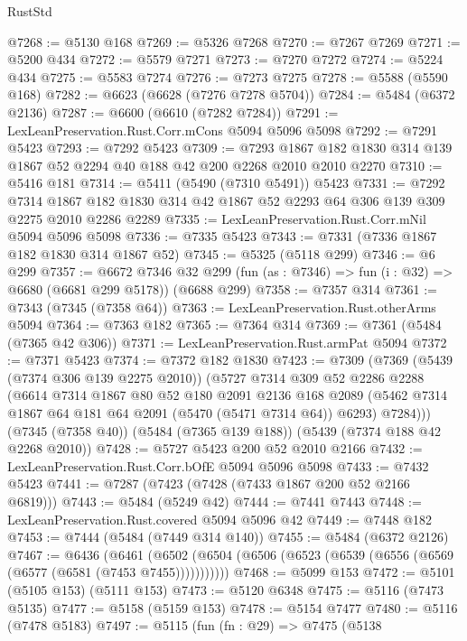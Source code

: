 \begin{lexlean}{RustStd}
\begin{coremodule}
{\begin{coremodule}
{{{{{{{{{{{{{{{{{{{{{{{{{{{{{{{@7268 := @5130 @168
@7269 := @5326 @7268
@7270 := @7267 @7269
@7271 := @5200 @434
@7272 := @5579 @7271
@7273 := @7270 @7272
@7274 := @5224 @434
@7275 := @5583 @7274
@7276 := @7273 @7275
@7278 := @5588 (@5590 @168)
@7282 := @6623 (@6628 (@7276 @7278 @5704))
@7284 := @5484 (@6372 @2136)
@7287 := @6600 (@6610 (@7282 @7284))
@7291 := LexLeanPreservation.Rust.Corr.mCons @5094 @5096 @5098
@7292 := @7291 @5423
@7293 := @7292 @5423
@7309 := @7293 @1867 @182 @1830 @314 @139 @1867 @52 @2294 @40 @188 @42 @200 @2268 @2010 @2010 @2270
@7310 := @5416 @181
@7314 := @5411 (@5490 (@7310 @5491)) @5423
@7331 := @7292
    @7314
    @1867
    @182
    @1830
    @314
    @42
    @1867
    @52
    @2293
    @64
    @306
    @139
    @309
    @2275
    @2010
    @2286
    @2289
@7335 := LexLeanPreservation.Rust.Corr.mNil @5094 @5096 @5098
@7336 := @7335 @5423
@7343 := @7331 (@7336 @1867 @182 @1830 @314 @1867 @52)
@7345 := @5325 (@5118 @299)
@7346 := @6 @299
@7357 := @6672
    @7346
    @32
    @299
    (fun (as : @7346) => fun (i : @32) => @6680 (@6681 @299 @5178))
    (@6688 @299)
@7358 := @7357 @314
@7361 := @7343 (@7345 (@7358 @64))
@7363 := LexLeanPreservation.Rust.otherArms @5094
@7364 := @7363 @182
@7365 := @7364 @314
@7369 := @7361 (@5484 (@7365 @42 @306))
@7371 := LexLeanPreservation.Rust.armPat @5094
@7372 := @7371 @5423
@7374 := @7372 @182 @1830
@7423 := @7309
    (@7369
      (@5439 (@7374 @306 @139 @2275 @2010))
      (@5727
        @7314
        @309
        @52
        @2286
        @2288
        (@6614
          @7314
          @1867
          @80
          @52
          @180
          @2091
          @2136
          @168
          @2089
          (@5462 @7314 @1867 @64 @181 @64 @2091 (@5470 (@5471 @7314 @64)) @6293)
          @7284)))
    (@7345 (@7358 @40))
    (@5484 (@7365 @139 @188))
    (@5439 (@7374 @188 @42 @2268 @2010))
@7428 := @5727 @5423 @200 @52 @2010 @2166
@7432 := LexLeanPreservation.Rust.Corr.bOfE @5094 @5096 @5098
@7433 := @7432 @5423
@7441 := @7287 (@7423 (@7428 (@7433 @1867 @200 @52 @2166 @6819)))
@7443 := @5484 (@5249 @42)
@7444 := @7441 @7443
@7448 := LexLeanPreservation.Rust.covered @5094 @5096 @42
@7449 := @7448 @182
@7453 := @7444 (@5484 (@7449 @314 @140))
@7455 := @5484 (@6372 @2126)
@7467 := @6436
    (@6461 (@6502 (@6504 (@6506 (@6523 (@6539 (@6556 (@6569 (@6577 (@6581 (@7453 @7455)))))))))))
@7468 := @5099 @153
@7472 := @5101 (@5105 @153) (@5111 @153)
@7473 := @5120 @6348
@7475 := @5116 (@7473 @5135)
@7477 := @5158 (@5159 @153)
@7478 := @5154 @7477
@7480 := @5116 (@7478 @5183)
@7497 := @5115
    (fun (fn : @29) =>
    @7475
      (@5138
}}}}}}}}}}}}}}}}}}}}}}}}}}}}}}}
\end{coremodule}}
\end{coremodule}
\end{lexlean}
